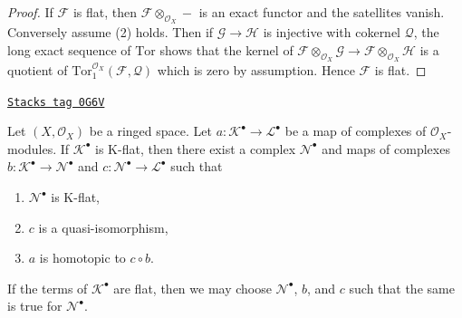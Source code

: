 \begin{proof}
If $\mathcal{F}$ is flat, then $\mathcal{F} \otimes_{\mathcal{O}_X} -$
is an exact functor and the satellites vanish. Conversely assume (2)
holds. Then if $\mathcal{G} \to \mathcal{H}$ is injective with cokernel
$\mathcal{Q}$, the long exact sequence of $\text{Tor}$ shows that
the kernel of
$\mathcal{F} \otimes_{\mathcal{O}_X} \mathcal{G} \to
\mathcal{F} \otimes_{\mathcal{O}_X} \mathcal{H}$
is a quotient of
$\text{Tor}_1^{\mathcal{O}_X}(\mathcal{F}, \mathcal{Q})$
which is zero by assumption. Hence $\mathcal{F}$ is flat.
\end{proof}

\begin{lemma}
\label{cohomology-lemma-factor-through-K-flat}
\href{https://stacks.math.columbia.edu/tag/0G6V}{\texttt{Stacks tag 0G6V}}

Let $(X, \mathcal{O}_X)$ be a ringed space.
Let $a : \mathcal{K}^\bullet \to \mathcal{L}^\bullet$ be a map of complexes
of $\mathcal{O}_X$-modules. If $\mathcal{K}^\bullet$ is K-flat, then
there exist a complex $\mathcal{N}^\bullet$ and maps of complexes
$b : \mathcal{K}^\bullet \to \mathcal{N}^\bullet$
and $c : \mathcal{N}^\bullet \to \mathcal{L}^\bullet$ such that
\begin{enumerate}
\item $\mathcal{N}^\bullet$ is K-flat,
\item $c$ is a quasi-isomorphism,
\item $a$ is homotopic to $c \circ b$.
\end{enumerate}
If the terms of $\mathcal{K}^\bullet$ are flat, then we may choose
$\mathcal{N}^\bullet$, $b$, and $c$
such that the same is true for $\mathcal{N}^\bullet$.
\end{lemma}


